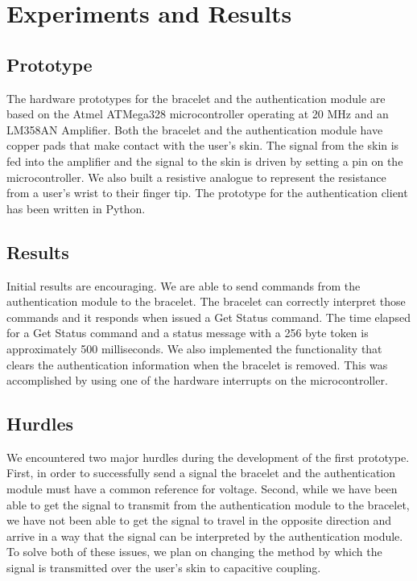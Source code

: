 \section{Experiments and Results}\label{sec:results}
\subsection{Prototype}
The hardware prototypes for the bracelet and the authentication module are based on the Atmel ATMega328 microcontroller operating at 20 MHz and an LM358AN Amplifier.  Both the bracelet and the authentication module have copper pads that make contact with the user's skin.  The signal from the skin is fed into the amplifier and the signal to the skin is driven by setting a pin on the microcontroller.  We also built a resistive analogue to represent the resistance from a user's wrist to their finger tip.  The prototype for the authentication client has been written in Python.
\subsection{Results}
Initial results are encouraging.  We are able to send commands from the authentication module to the bracelet.  The bracelet can correctly interpret those commands and it responds when issued a Get Status command.   The time elapsed for a Get Status command and a status message with a 256 byte token is approximately 500 milliseconds.  
We also implemented the functionality that clears the authentication information when the bracelet is removed.  This was accomplished by using one of the hardware interrupts on the microcontroller. 
\subsection{Hurdles}
We encountered two major hurdles during the development of the first prototype.  First, in order to successfully send a signal the bracelet and the authentication module must have a common reference for voltage.  Second, while we have been able to get the signal to transmit from the authentication module to the bracelet, we have not been able to get the signal to travel in the opposite direction and arrive in a way that the signal can be interpreted by the authentication module.  To solve both of these issues, we plan on changing the method by which the signal is transmitted over the user's skin to capacitive coupling.
